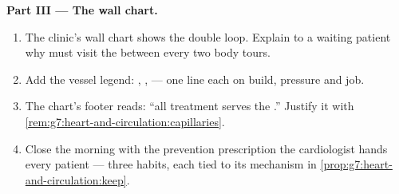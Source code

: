 \begin{problem}
\medskip\noindent\textbf{Part III --- The wall chart.}
\begin{enumerate}[resume]
  \item The clinic's wall chart shows the double loop.
        Explain to a waiting patient why  must
        visit the  between every two body tours.
  \item Add the vessel legend: , , 
        --- one line each on build, pressure and job.
  \item The chart's footer reads: ``all treatment
        serves the .'' Justify it with
        \cref{rem:g7:heart-and-circulation:capillaries}.
  \item Close the morning with the prevention
        prescription the cardiologist hands every
        patient --- three habits, each tied to its
        mechanism in
        \cref{prop:g7:heart-and-circulation:keep}.
\end{enumerate}
\end{problem}
